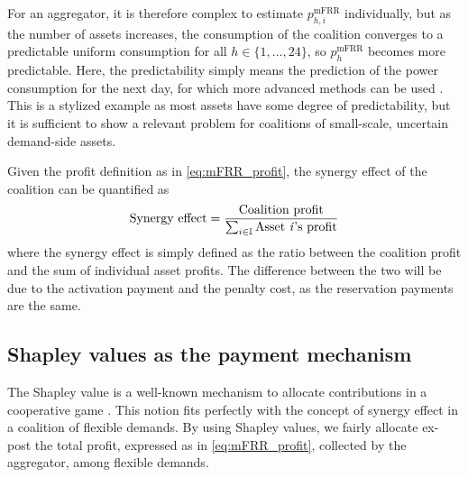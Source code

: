 \documentclass[conference]{IEEEtran}
\begin{document}
For an aggregator, it is therefore complex to estimate $p^{\text{mFRR}}_{h, i}$ individually, but as the number of assets increases, the consumption of the coalition converges to a predictable uniform consumption for all $h \in \{1, \hdots, 24 \}$, so $p^{\text{mFRR}}_{h}$ becomes more predictable. Here, the predictability simply means the prediction of the power consumption for the next day, for which more advanced methods can be used \cite{ziras2021baselines}.
This is a stylized example as most assets have some degree of predictability, but it is sufficient to show a  relevant problem for coalitions of small-scale, uncertain demand-side assets. 

Given the profit definition as in \eqref{eq:mFRR_profit}, the synergy effect of the coalition can be quantified as
%
\begin{align}\label{eq:synergy_effect}
    \text{Synergy effect} = \frac{ \text{Coalition profit} }{ \sum_{i \in \mathbb{I}} \text{Asset \textit{i}'s profit} }
\end{align}
where the synergy effect is simply defined as the ratio between the coalition profit and the sum of individual asset profits. The difference between the two will be due to the activation payment and the penalty cost, as the reservation payments are the same.

\subsection{Shapley values as the payment mechanism}
%
The Shapley value is a well-known mechanism to allocate contributions in a cooperative game \cite{shapley1997value}. This notion fits perfectly with the concept of synergy effect in a coalition of flexible demands. By using Shapley values, we fairly allocate ex-post the total profit, expressed as in \eqref{eq:mFRR_profit}, collected by the aggregator, among flexible demands.


\end{document}
